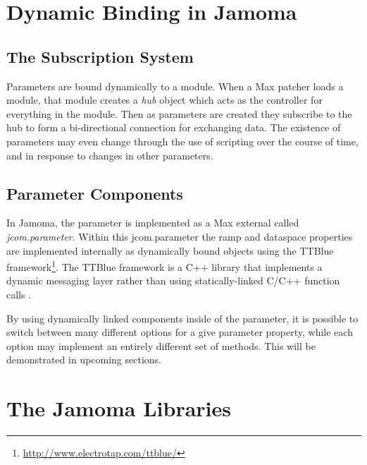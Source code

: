 \documentclass{article}
\begin{document}
\section{Dynamic Binding in Jamoma}

\subsection{The Subscription System}

Parameters are bound dynamically to a module.  When a Max patcher loads a module, that module creates a \emph{hub} object which acts as the controller for everything in the module.  Then as parameters are created they subscribe to the hub to form a bi-directional connection for exchanging data.  The existence of parameters may even change through the use of scripting over the course of time, and in response to changes in other parameters.

\subsection{Parameter Components}

In Jamoma, the parameter is implemented as a Max external called \emph{jcom.parameter}.  Within this jcom.parameter the ramp and dataspace properties are implemented internally as dynamically bound objects using the TTBlue framework\footnote{\url{http://www.electrotap.com/ttblue/}}.  The TTBlue framework is a C++ library that implements a dynamic messaging layer rather than using statically-linked C/C++ function calls \cite{Place:2008ttblue}.  

By using dynamically linked components inside of the parameter, it is possible to switch between many different options for a give parameter property, while each option may implement an entirely different set of methods.  This will be demonstrated in upcoming sections.


\section{The Jamoma Libraries}
\end{document}
